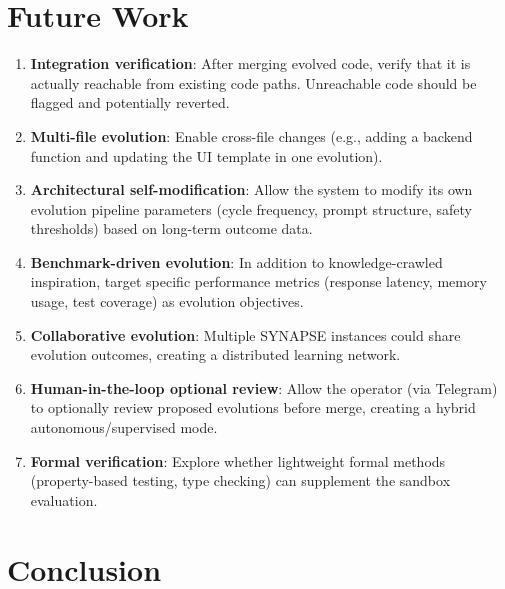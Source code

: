 \documentclass[11pt,a4paper]{article}
\begin{document}
\section{Future Work}
\label{sec:future}

\begin{enumerate}
    \item \textbf{Integration verification}: After merging evolved code, verify that it is actually reachable from existing code paths. Unreachable code should be flagged and potentially reverted.
    
    \item \textbf{Multi-file evolution}: Enable cross-file changes (e.g., adding a backend function and updating the UI template in one evolution).
    
    \item \textbf{Architectural self-modification}: Allow the system to modify its own evolution pipeline parameters (cycle frequency, prompt structure, safety thresholds) based on long-term outcome data.
    
    \item \textbf{Benchmark-driven evolution}: In addition to knowledge-crawled inspiration, target specific performance metrics (response latency, memory usage, test coverage) as evolution objectives.
    
    \item \textbf{Collaborative evolution}: Multiple SYNAPSE instances could share evolution outcomes, creating a distributed learning network.
    
    \item \textbf{Human-in-the-loop optional review}: Allow the operator (via Telegram) to optionally review proposed evolutions before merge, creating a hybrid autonomous/supervised mode.
    
    \item \textbf{Formal verification}: Explore whether lightweight formal methods (property-based testing, type checking) can supplement the sandbox evaluation.
\end{enumerate}

\section{Conclusion}
\label{sec:conclusion}
\end{document}
